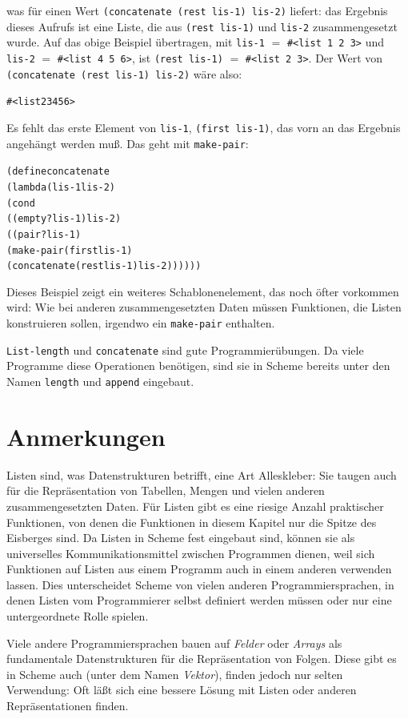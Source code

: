 was für einen Wert \texttt{(concatenate (rest lis-1) lis-2)} liefert: das Ergebnis
dieses Aufrufs ist eine
Liste, die aus \texttt{(rest lis-1)} und \texttt{lis-2} zusammengesetzt
wurde.  Auf das obige Beispiel übertragen, mit \texttt{lis-1} $=$
\verb|#<list 1 2 3>| und \texttt{lis-2} $=$
\verb|#<list 4 5 6>|, ist \texttt{(rest lis-1)} $=$ \verb|#<list 2 3>|.
Der Wert von \texttt{(concatenate (rest lis-1) lis-2)} wäre
also:
%
\begin{alltt}
#<list 2 3 4 5 6>
\end{alltt}
%
Es fehlt das erste Element von \texttt{lis-1}, \texttt{(first
  lis-1)}, das vorn an das Ergebnis angehängt werden muß.  Das geht
mit \texttt{make-pair}:
%
\begin{alltt}
(define concatenate
  (lambda (lis-1 lis-2)
    (cond
      ((empty? lis-1) lis-2)
      ((pair? lis-1) 
       (make-pair (first lis-1)
                  (concatenate (rest lis-1) lis-2))))))
\end{alltt}
%
Dieses Beispiel zeigt ein weiteres Schablonenelement, das noch öfter
vorkommen wird:  Wie bei anderen zusammengesetzten Daten müssen Funktionen, die
Listen konstruieren sollen, irgendwo ein \texttt{make-pair} enthalten.

\texttt{List-length} und \texttt{concatenate} sind gute
Programmierübungen.  Da viele Programme diese Operationen benötigen,
sind sie in Scheme bereits unter den Namen
\texttt{length} und
\texttt{append} eingebaut.


\section*{Anmerkungen}

Listen sind, was Datenstrukturen betrifft, eine Art Alleskleber:
Sie taugen auch für die Repräsentation von Tabellen,
Mengen und vielen anderen zusammengesetzten Daten.  Für Listen gibt es
eine riesige Anzahl praktischer Funktionen, von denen die Funktionen in
diesem Kapitel nur die Spitze des Eisberges sind.  Da 
Listen in Scheme fest eingebaut sind, können sie als universelles
Kommunikationsmittel zwischen Programmen dienen, weil sich Funktionen
auf Listen aus einem Programm auch in einem anderen verwenden lassen.
Dies unterscheidet Scheme von vielen anderen Programmiersprachen, in
denen Listen vom Programmierer selbst definiert werden müssen oder nur
eine untergeordnete Rolle spielen.

Viele andere Programmiersprachen bauen auf \textit{Felder} oder
\textit{Arrays} als fundamentale Datenstrukturen für die
Repräsentation von Folgen.  Diese gibt es in
Scheme auch (unter dem Namen \textit{Vektor}), finden jedoch
nur selten Verwendung: Oft läßt sich eine
bessere Lösung mit Listen oder anderen Repräsentationen finden.

